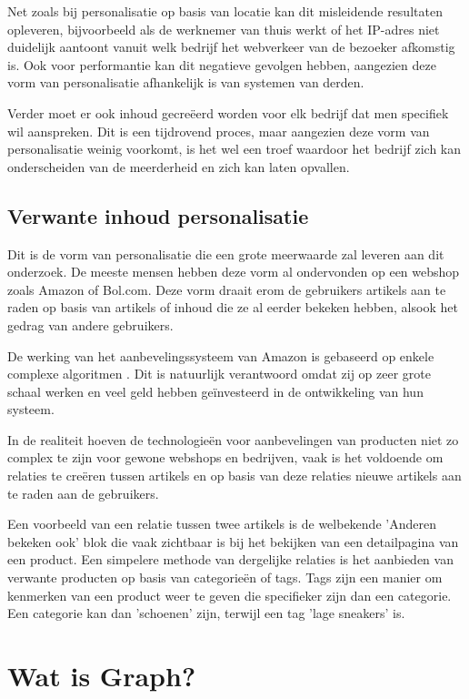 Net zoals bij personalisatie op basis van locatie kan dit misleidende resultaten opleveren, bijvoorbeeld als de werknemer van thuis werkt of het IP-adres niet duidelijk aantoont vanuit welk bedrijf het webverkeer van de bezoeker afkomstig is. Ook voor performantie kan dit negatieve gevolgen hebben, aangezien deze vorm van personalisatie afhankelijk is van systemen van derden. 

Verder moet er ook inhoud gecreëerd worden voor elk bedrijf dat men specifiek wil aanspreken. Dit is een tijdrovend proces, maar aangezien deze vorm van personalisatie weinig voorkomt, is het wel een troef waardoor het bedrijf zich kan onderscheiden van de meerderheid en zich kan laten opvallen.

  
 \subsection{Verwante inhoud personalisatie}
 \label{subsec:Verwante inhoud personalisatie}
 
 Dit is de vorm van personalisatie die een grote meerwaarde zal leveren aan dit onderzoek. De meeste mensen hebben deze vorm al ondervonden op een webshop zoals Amazon of Bol.com. Deze vorm draait erom de gebruikers artikels aan te raden op basis van artikels of inhoud die ze al eerder bekeken hebben, alsook het gedrag van andere gebruikers.
 
De werking van het aanbevelingssysteem van Amazon is gebaseerd op enkele complexe algoritmen  \autocite{Linden2003}. Dit is natuurlijk verantwoord omdat zij op zeer grote schaal werken en veel geld hebben geïnvesteerd in de ontwikkeling van hun systeem. 

In de realiteit hoeven de technologieën voor aanbevelingen van producten niet zo complex te zijn voor gewone webshops en bedrijven, vaak is het voldoende om relaties te creëren tussen artikels en op basis van deze relaties nieuwe artikels aan te raden aan de gebruikers. 

Een voorbeeld van een relatie tussen twee artikels is de welbekende 'Anderen bekeken ook' blok die vaak zichtbaar is bij het bekijken van een detailpagina van een product. 
Een simpelere methode van dergelijke relaties is het aanbieden van verwante producten op basis van categorieën of tags. Tags zijn een manier om kenmerken van een product weer te geven die specifieker zijn dan een categorie. Een categorie kan dan 'schoenen' zijn, terwijl een tag 'lage sneakers' is. 


\section{Wat is Graph?}
\label{sec:wat is Graph?}

